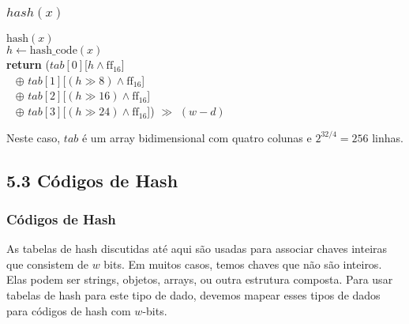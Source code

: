 \documentclass{beamer}
\begin{document}
\begin{frame}
\frametitle{$hash(x)$}
\begin{oframed}
\begin{flushleft}
\hspace*{1em} \ensuremath{\mathrm{hash}(x)}\\
\hspace*{1em} \hspace*{1em} \ensuremath{h \gets  \ensuremath{\mathrm{hash\_code}(x)}}\\
\hspace*{1em} \hspace*{1em} {\color{black} \textbf{return}}  (\ensuremath{\ensuremath{\mathit{tab}}[0]}[\ensuremath{h \wedge \mathrm{ff}_{16}}] \\\
\hspace*{1em} \hspace*{1em} \hspace*{1em} \hspace*{1em}  \ensuremath{\oplus} \ensuremath{\ensuremath{\mathit{tab}}[1]}[\ensuremath{(h\ensuremath{\gg}8) \wedge \mathrm{ff}_{16}}] \\\
\hspace*{1em} \hspace*{1em} \hspace*{1em} \hspace*{1em}  \ensuremath{\oplus} \ensuremath{\ensuremath{\mathit{tab}}[2]}[\ensuremath{(h\ensuremath{\gg}16) \wedge \mathrm{ff}_{16}}] \\\
\hspace*{1em} \hspace*{1em} \hspace*{1em} \hspace*{1em}  \ensuremath{\oplus} \ensuremath{\ensuremath{\mathit{tab}}[3]}[\ensuremath{(h\ensuremath{\gg}24) \wedge \mathrm{ff}_{16}}]) \ensuremath{\gg} \ensuremath{(w-d)}\\
\end{flushleft}
\end{oframed}
Neste caso, \ensuremath{\ensuremath{\ensuremath{\mathit{tab}}}} é um array bidimensional com quatro colunas e 
$2^{32/4}=256$ linhas.

\end{frame}

\subsection{5.3 Códigos de Hash}
\begin{frame}
\frametitle{Códigos de Hash}
As tabelas de hash discutidas até aqui são usadas para associar chaves inteiras que consistem de \ensuremath{\ensuremath{w}} bits.  Em muitos casos, temos chaves que não são inteiros.  Elas podem ser strings, objetos, arrays,
ou outra estrutura composta.  Para usar tabelas de hash para este tipo de dado,
devemos mapear esses tipos de dados para códigos de hash com \ensuremath{\ensuremath{w}}-bits.  

\end{frame}
\end{document}
